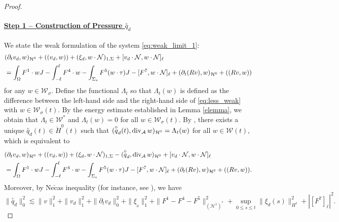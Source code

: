 \documentclass[letterpaper,reqno,10pt,twoside]{amsart}
\theoremstyle{definition}
\theoremstyle{remark}
\def\p{\partial}
\def\Om{\Omega}
\def\dive{\mathop{\rm div}\nolimits}
\begin{document}
	\begin{proof}
		\
		\paragraph{\underline{Step 1 -- Construction of Pressure $\overset{\circ}q_{d}$}}
		
		We state the weak formulation of the system \eqref{eq:weak_limit_1}:
		\begin{equation}{\label{eq:less_weak}}
			\begin{aligned}
				& (\p_tv_{d}, w)_{\mathcal{H}^0}+((v_{d},w))+ (\xi_{d}, w\cdot\mathcal{N})_{1,\Sigma}+ [v_{d}\cdot\mathcal{N},w\cdot\mathcal{N}]_\ell\\
				&=\int_\Om F^1\cdot wJ-\int_{-\ell}^{\ell} F^4\cdot w-\int_{\Sigma_s}F^5(w\cdot\tau)J -[F^7,w\cdot\mathcal{N}]_\ell+(\p_{t}(Rv),w)_{\mathcal{H}^{0}}+((Rv,w))
			\end{aligned}
		\end{equation}
		for any $w\in\mathcal{W}_{\sigma}$. Define the functional $\Lambda_t$ so that $\Lambda_t(w)$ is defined as the difference between the left-hand side and the right-hand side of \eqref{eq:less_weak} with $w\in\mathcal{W}_{\sigma}(t)$. By the energy estimate established in Lemma \ref{elemma}, we obtain that $\Lambda_{t}\in \mathcal{W}^{\ast}$ and $\Lambda_t(w)=0$ for all $w\in\mathcal{W}_\sigma(t)$.  By \cite[Theorem 4.6]{GT18}, there exists a unique $\overset{\circ}q_{d}(t)\in\mathring{H}^0(t)$ such that $(\overset{\circ}q_{d}(t),\dive_{\mathcal{A}}w)_{\mathcal{H}^0}=\Lambda_t(w)$ for all $w\in\mathcal{W}(t)$, which is equivalent to
		\begin{equation}\label{eq:weak_pressure_1}
			\begin{aligned}
				&(\p_tv_{d}, w)_{\mathcal{H}^0} + ((v_{d},w)) + (\xi_{d}, w\cdot\mathcal{N})_{1,\Sigma}-(\overset{\circ}q_{d},\dive_{\mathcal{A}}w)_{\mathcal{H}^0}
				+[v_{d}\cdot \mathcal{N},w\cdot\mathcal{N}]_\ell\\
				&=\int_\Om F^1\cdot wJ-\int_{-\ell}^{\ell} F^4\cdot w-\int_{\Sigma_s}F^5(w\cdot\tau)J -[F^7,w\cdot\mathcal{N}]_\ell+(\p_{t}(Rv),w)_{\mathcal{H}^{0}}+((Rv,w)).
			\end{aligned}
		\end{equation}
		Moreover, by Ne$\check{\text{c}}$as inequality (for instance, see \cite{boyer_fabrie}), we have
		\begin{equation}\label{est:pressure_3}
			\|\overset{\circ}q_{d}\|_0^2\lesssim \|v\|_{1}^{2}+ \|v_{d}\|_1^2+\|\p_tv_{d}\|^{2}_0 +\|\xi_{_{d}}\|_{1}^2 + \|F^1-F^{4}-F^{5} \|^{2}_{(\mathcal{H}^1)^\ast}+\sup_{0\leq s\leq t}\|\xi_{d}(s)\|_{H^{1}}^{2}+|[F^{7}]_{\ell}|^{2}.
		\end{equation}
		

\end{proof}
\end{document}
